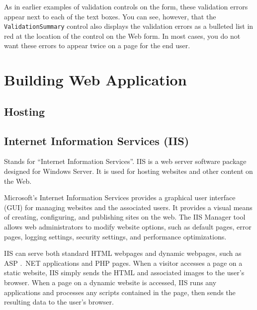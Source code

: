 As in earlier examples of validation controls on the form, these validation errors appear next to each of
the text boxes. You can see, however, that the \texttt{ValidationSummary} control also displays the validation
errors as a bulleted list in red at the location of the control on the Web form. In most cases, you do not
want these errors to appear twice on a page for the end user.


\section{Building Web Application}
\subsection*{Hosting}

\subsection*{Internet Information Services (IIS)}
%
%

Stands for “Internet Information Services”. IIS is a web server software package designed for Windows Server. It is used for hosting websites and other content on the Web.

Microsoft’s Internet Information Services provides a graphical user interface (GUI) for managing websites and the associated users. It provides a visual means of creating, configuring, and publishing sites on the web. The IIS Manager tool allows web administrators to modify website options, such as default pages, error pages, logging settings, security settings, and performance optimizations.

IIS can serve both standard HTML webpages and dynamic webpages, such as ASP .\ NET applications and PHP pages. When a visitor accesses a page on a static website, IIS simply sends the HTML and associated images to the user’s browser. When a page on a dynamic website is accessed, IIS runs any applications and processes any scripts contained in the page, then sends the resulting data to the user’s browser.

